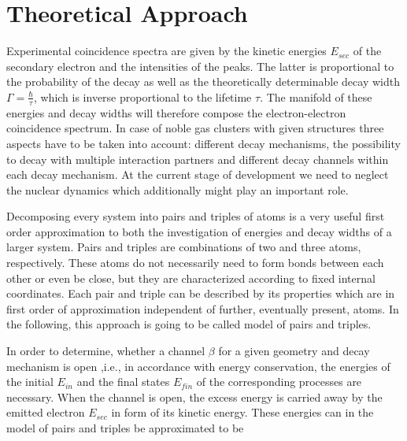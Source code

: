 \section{Theoretical Approach}
Experimental coincidence spectra are given by the kinetic energies $E_{sec}$
of the secondary electron
and the intensities of the peaks. The latter is proportional to the
probability of the decay as well as the theoretically determinable
decay width $\Gamma=\frac{\hbar}{\tau}$,
which is inverse proportional to the lifetime $\tau$. The manifold of these
energies and decay widths will therefore compose the electron-electron
coincidence spectrum.
In case of noble gas clusters
with given structures three aspects have to be taken into account:
different decay mechanisms, the possibility to decay with multiple
interaction partners and different decay channels within each decay mechanism.
At the current stage of development we need to neglect the nuclear dynamics which
additionally might play an important role.

Decomposing every system into pairs and triples of atoms is a very useful
first order approximation to both the investigation of energies and
decay widths of a larger system. Pairs and triples are combinations of
two and three atoms, respectively.
These atoms do not necessarily need to form bonds between each other or
even be close, but they are characterized according to fixed internal
coordinates. Each pair and triple can be described by its properties
which are in first order of approximation independent of further, eventually
present, atoms. In the following, this approach is going to be called
model of pairs and triples.

In order to determine, whether a channel $\beta$ for a given geometry and decay
mechanism is open ,i.e., in accordance with energy conservation,
the energies of the initial $E_{in}$ and the final states $E_{fin}$ of
the corresponding processes are necessary.
When the channel
is open, the excess energy is carried away by the emitted electron $E_{sec}$
in form of its kinetic energy. These energies can in the model
of pairs and triples be approximated to be

